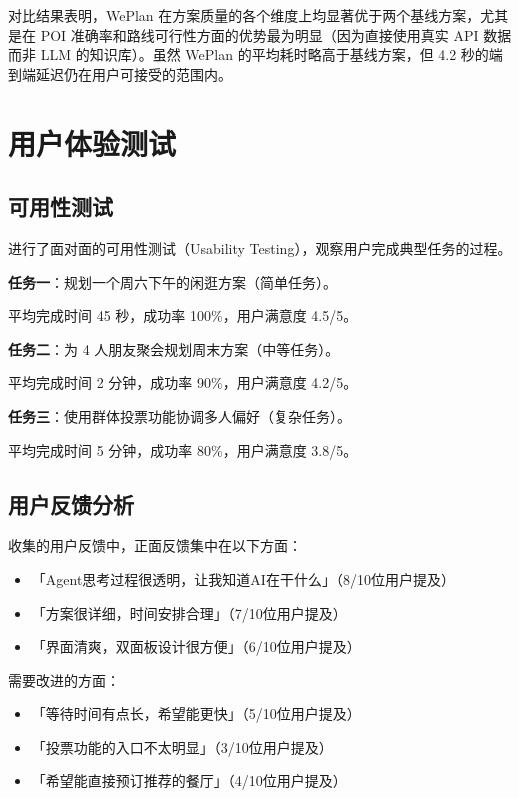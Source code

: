 \documentclass[12pt,a4paper]{ctexart}
\begin{document}
对比结果表明，WePlan 在方案质量的各个维度上均显著优于两个基线方案，尤其是在 POI 准确率和路线可行性方面的优势最为明显（因为直接使用真实 API 数据而非 LLM 的知识库）。虽然 WePlan 的平均耗时略高于基线方案，但 4.2 秒的端到端延迟仍在用户可接受的范围内。

\section{用户体验测试}

\subsection{可用性测试}

进行了面对面的可用性测试（Usability Testing），观察用户完成典型任务的过程。

\textbf{任务一}：规划一个周六下午的闲逛方案（简单任务）。

平均完成时间 45 秒，成功率 100\%，用户满意度 4.5/5。

\textbf{任务二}：为 4 人朋友聚会规划周末方案（中等任务）。

平均完成时间 2 分钟，成功率 90\%，用户满意度 4.2/5。

\textbf{任务三}：使用群体投票功能协调多人偏好（复杂任务）。

平均完成时间 5 分钟，成功率 80\%，用户满意度 3.8/5。

\subsection{用户反馈分析}

收集的用户反馈中，正面反馈集中在以下方面：

\begin{itemize}[leftmargin=2em]
  \item 「Agent思考过程很透明，让我知道AI在干什么」（8/10位用户提及）
  \item 「方案很详细，时间安排合理」（7/10位用户提及）
  \item 「界面清爽，双面板设计很方便」（6/10位用户提及）
\end{itemize}

需要改进的方面：

\begin{itemize}[leftmargin=2em]
  \item 「等待时间有点长，希望能更快」（5/10位用户提及）
  \item 「投票功能的入口不太明显」（3/10位用户提及）
  \item 「希望能直接预订推荐的餐厅」（4/10位用户提及）
\end{itemize}
\end{document}
